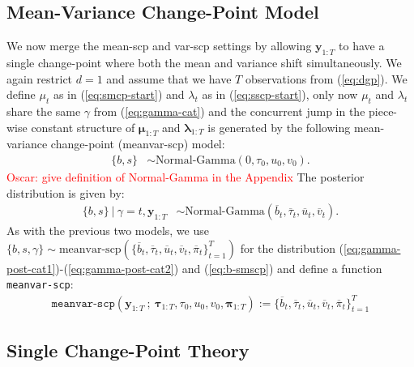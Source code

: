 \subsection{Mean-Variance Change-Point Model}
\label{sec:smscp}

We now merge the mean-scp and var-scp settings by allowing $\mathbf{y}_{1:T}$ to have a single change-point where both the mean and variance shift simultaneously. We again restrict $d=1$ and assume that we have $T$ observations from (\ref{eq:dgp}). We define $\mu_t$ as in (\ref{eq:smcp-start}) and $\lambda_t$ as in (\ref{eq:sscp-start}), only now $\mu_t$ and $\lambda_t$ share the same $\gamma$ from (\ref{eq:gamma-cat}) and the concurrent jump in the piece-wise constant structure of $\boldsymbol{\mu}_{1:T}$ and $\boldsymbol{\lambda}_{1:T}$ is generated by the following mean-variance change-point (meanvar-scp) model:
\begin{align}
    \{b,s\} &\sim \text{Normal-Gamma}(0,\tau_0, u_0, v_0).
    \label{eq:smscp-end}
\end{align}
\textcolor{red}{Oscar: give definition of Normal-Gamma in the Appendix}
The posterior distribution is given by:
\begin{align}
    \{b,s\} \:|\: \gamma = t, \mathbf{y}_{1:T} &\sim \text{Normal-Gamma}(\overline{b}_t, \overline{\tau}_t, \overline{u}_t, \overline{v}_t). \label{eq:b-smscp}
\end{align}
As with the previous two models, we use $\{b,s,\gamma\} \sim \text{meanvar-scp}(\{\overline{b}_t, \overline{\tau}_t, \overline{u}_t, \overline{v}_t, \overline{\pi}_t\}_{t=1}^T)$ for the distribution (\ref{eq:gamma-post-cat1})-(\ref{eq:gamma-post-cat2}) and (\ref{eq:b-smscp}) and define a function \texttt{meanvar-scp}: 
\begin{align}\label{eq:meanvar-scp-fn}
    \texttt{meanvar-scp}\left(\mathbf{y}_{1:T} \:;\: \boldsymbol{\tau}_{1:T}, \tau_0, u_0, v_0, \boldsymbol{\pi}_{1:T}\right) := \{\overline{b}_t, \overline{\tau}_t, \overline{u}_t, \overline{v}_t, \overline{\pi}_t\}_{t=1}^T
\end{align}

\subsection{Single Change-Point Theory}
\label{sec:localization}

